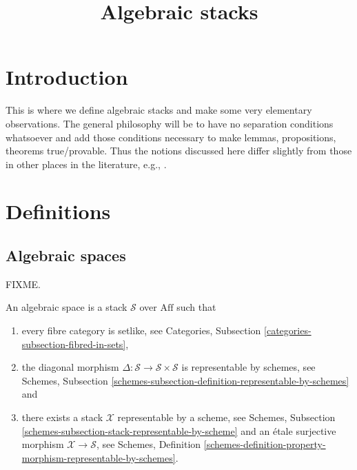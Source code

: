 

%


\title{Algebraic stacks}


\maketitle

\tableofcontents

\section{Introduction}
\label{section-introduction}

\noindent
This is where we define algebraic stacks and make some very elementary
observations. The general philosophy will be to have no separation
conditions whatsoever and add those conditions necessary to make lemmas,
propositions, theorems true/provable. Thus the notions discussed here 
differ slightly from those in other places in the literature, e.g.,
\cite{LM-B}.

\section{Definitions}
\label{section-definitions}

\subsection{Algebraic spaces}
\label{subsection-algebraic-spaces}

\noindent
FIXME.

\begin{definition}
An algebraic space is a stack $\mathcal{S}$ over $\text{Aff}$ such that
\begin{enumerate}
\item every fibre category is setlike, see Categories, Subsection
\ref{categories-subsection-fibred-in-sets}, 
\item the diagonal morphism
$\Delta : \mathcal{S} \to \mathcal{S}\times\mathcal{S}$
is representable by schemes, see Schemes, Subsection
\ref{schemes-subsection-definition-representable-by-schemes} and
\item there exists a stack $\mathcal{X}$ representable by a scheme, see
Schemes, Subsection \ref{schemes-subsection-stack-representable-by-scheme}
and an \'etale surjective morphism $\mathcal{X} \to \mathcal{S}$,
see Schemes, Definition
\ref{schemes-definition-property-morphism-representable-by-schemes}.
\end{enumerate}
\end{definition}

